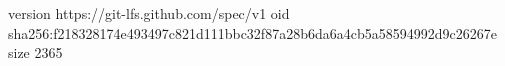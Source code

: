 version https://git-lfs.github.com/spec/v1
oid sha256:f218328174e493497c821d111bbc32f87a28b6da6a4cb5a58594992d9c26267e
size 2365
